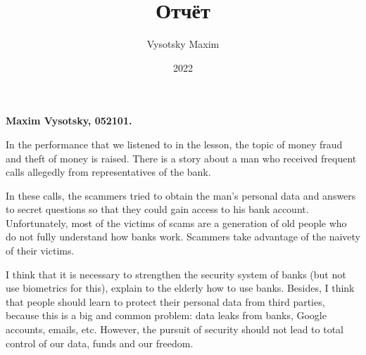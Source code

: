 \documentclass[a4paper,12pt]{minimal}
\author{Vysotsky Maxim}
\title{Отчёт}
\date{2022}
\begin{document}
	\textbf{Maxim Vysotsky, 052101.}
	
	\hspace{\parindent}In the performance that we listened to in the lesson, the topic of money fraud and theft of money is raised. There is a story about a man who received frequent calls allegedly from representatives of the bank. 
	
	In these calls, the scammers tried to obtain the man's personal data and answers to secret questions so that they could gain access to his bank account. Unfortunately, most of the victims of scams are a generation of old people who do not fully understand how banks work. Scammers take advantage of the naivety of their victims.
	
	I think that it is necessary to strengthen the security system of banks (but not use biometrics for this), explain to the elderly how to use banks. Besides, I think that people should learn to protect their personal data from third parties, because this is a big and common problem: data leaks from banks, Google accounts, emails, etc. However, the pursuit of security should not lead to total control of our data, funds and our freedom.
	
\end{document}
